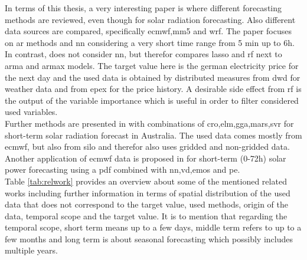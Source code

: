 In terms of this thesis, a very interesting paper is  where different forecasting methods are reviewed, even though for solar radiation forecasting. Also different data sources are compared, specifically \gls{ecmwf},\gls{mm5} and \gls{wrf}. The paper focuses on \gls{ar} methods and \gls{nn} considering a very short time range from 5 min up to 6h.\\
In contrast,  does not consider \gls{nn}, but therefor compares \gls{lasso} and \gls{rf} next to \gls{arma} and \gls{armax} models. The target value here is the german electricity price for the next day and the used data is obtained by distributed measures from \gls{dwd} for weather data and from \gls{epex} for the price history. A desirable side effect from \gls{rf} is the output of the variable importance which is useful in order to filter considered used variables.\\
Further methods are presented in  with combinations of \gls{cro},\gls{elm},\gls{gga},\gls{mars},\gls{svr} for short-term solar radiation forecast in Australia. The used data comes mostly from \gls{ecmwf}, but also from \gls{silo} and therefor also uses gridded and non-gridded data.\\
Another application of \gls{ecmwf} data is proposed in  for short-term (0-72h) solar power forecasting using a \gls{pdf} combined with \gls{nn},\gls{vd},\gls{emos} and \gls{pe}.\\

Table \ref{tab:relwork} provides an overview about some of the mentioned related works including further information in terms of spatial distribution of the used data that does not correspond to the target value, used methods, origin of the data, temporal scope and the target value. It is to mention that regarding the temporal scope, short term means up to a few days, middle term refers to up to a few months and long term is about seasonal forecasting which possibly includes multiple years.\\

